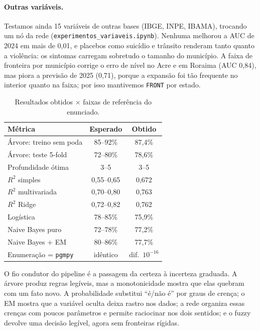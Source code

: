 \documentclass[10pt,a4paper,twocolumn]{article}
\begin{document}
\paragraph{Outras variáveis.}\label{sec:exp} Testamos ainda 15 variáveis de outras bases
(IBGE, INPE, IBAMA), trocando um nó da rede (\texttt{experimentos\_variaveis.ipynb}).
Nenhuma melhorou a AUC de 2024 em mais de 0,01, e placebos como suicídio e trânsito
renderam tanto quanto a violência: os sintomas carregam sobretudo o tamanho do município. A
faixa de fronteira por município corrige o erro de nível no Acre e em Roraima (AUC 0,84),
mas piora a previsão de 2025 (0,71), porque a expansão foi tão frequente no interior quanto
na faixa; por isso mantivemos \texttt{FRONT} por estado.

\begin{table}[t]
\centering\small
\begin{tabular}{@{}lcc@{}}
\toprule
Métrica & Esperado & Obtido\\
\midrule
Árvore: treino sem poda & 85--92\% & 87,4\%\\
Árvore: teste 5-fold & 72--80\% & 78,6\%\\
Profundidade ótima & 3--5 & 3--5\\
$R^2$ simples & 0,55--0,65 & 0,672\\
$R^2$ multivariada & 0,70--0,80 & 0,763\\
$R^2$ Ridge & 0,72--0,82 & 0,762\\
Logística & 78--85\% & 75,9\%\\
Naive Bayes puro & 72--78\% & 77,2\%\\
Naive Bayes + EM & 80--86\% & 77,7\%\\
Enumeração = \texttt{pgmpy} & idêntico & dif.\ $10^{-16}$\\
\bottomrule
\end{tabular}
\caption{Resultados obtidos $\times$ faixas de referência do enunciado.}\label{tab:ref}
\end{table}

O fio condutor do pipeline é a passagem da certeza à incerteza graduada. A árvore produz
regras legíveis, mas a monotonicidade mostra que elas quebram com um fato novo. A
probabilidade substitui ``é/não é'' por graus de crença; o EM mostra que a variável oculta
deixa rastro nos dados; a rede organiza essas crenças com poucos parâmetros e permite
raciocinar nos dois sentidos; e o fuzzy devolve uma decisão legível, agora sem fronteiras
rígidas.

\end{document}
